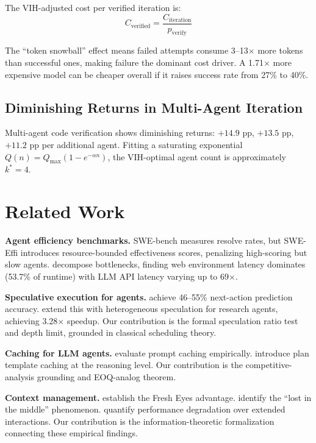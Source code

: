 \documentclass[11pt, a4paper, logo, copyright]{googledeepmind}
\begin{document}
The VIH-adjusted cost per verified iteration is:
\[
    C_{\mathrm{verified}} = \frac{C_{\mathrm{iteration}}}{p_{\mathrm{verify}}}
\]

The ``token snowball'' effect \citep{sweeffi2025} means failed attempts consume 3--13$\times$ more tokens than successful ones, making failure the dominant cost driver. A 1.71$\times$ more expensive model can be cheaper overall if it raises success rate from 27\% to 40\%.

\subsection{Diminishing Returns in Multi-Agent Iteration}

Multi-agent code verification shows diminishing returns: $+14.9$ pp, $+13.5$ pp, $+11.2$ pp per additional agent. Fitting a saturating exponential $Q(n) = Q_{\max}(1 - e^{-\alpha n})$, the VIH-optimal agent count is approximately $k^* = 4$.


\section{Related Work}\label{sec:related}

\textbf{Agent efficiency benchmarks.} SWE-bench \citep{sweeffi2025} measures resolve rates, but SWE-Effi introduces resource-bounded effectiveness scores, penalizing high-scoring but slow agents. \citet{bian2025limits} decompose bottlenecks, finding web environment latency dominates (53.7\% of runtime) with LLM API latency varying up to 69$\times$.

\textbf{Speculative execution for agents.} \citet{zhou2025speculative} achieve 46--55\% next-action prediction accuracy. \citet{ji2026dualspec} extend this with heterogeneous speculation for research agents, achieving 3.28$\times$ speedup. Our contribution is the formal speculation ratio test and depth limit, grounded in classical scheduling theory.

\textbf{Caching for LLM agents.} \citet{liang2026cache} evaluate prompt caching empirically. \citet{zhang2025apc} introduce plan template caching at the reasoning level. Our contribution is the competitive-analysis grounding and EOQ-analog theorem.

\textbf{Context management.} \citet{suzgun2024metaprompting} establish the Fresh Eyes advantage. \citet{liu2024lost} identify the ``lost in the middle'' phenomenon. \citet{agentdrift2026} quantify performance degradation over extended interactions. Our contribution is the information-theoretic formalization connecting these empirical findings.
\end{document}

